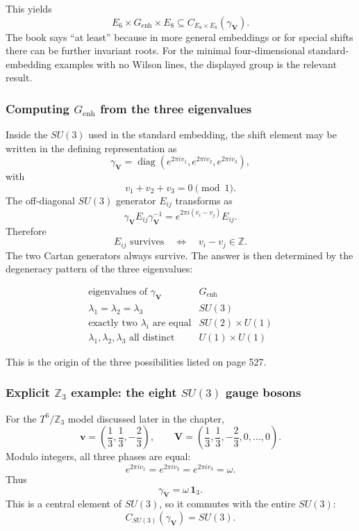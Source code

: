 \documentclass[
  10pt,
  a4paper,
  openany]{book}
\begin{document}
This yields \[
\boxed{
E_6\times G_{\mathrm{enh}}\times E_8
\subseteq
C_{E_8\times E_8}(\gamma_{\mathbf V})
}.
\] The book says ``at least'' because in more general embeddings or for
special shifts there can be further invariant roots. For the minimal
four-dimensional standard-embedding examples with no Wilson lines, the
displayed group is the relevant result.

\subsubsection{\texorpdfstring{Computing \(G_{\mathrm{enh}}\) from the
three
eigenvalues}{Computing G\_\{\textbackslash mathrm\{enh\}\} from the three eigenvalues}}\label{computing-g_mathrmenh-from-the-three-eigenvalues}

Inside the \(SU(3)\) used in the standard embedding, the shift element
may be written in the defining representation as \[
\gamma_{\mathbf V}
=
\operatorname{diag}
\left(
e^{2\pi i v_1},
e^{2\pi i v_2},
e^{2\pi i v_3}
\right),
\] with \[
v_1+v_2+v_3=0\pmod1.
\] The off-diagonal \(SU(3)\) generator \(E_{ij}\) transforms as \[
\gamma_{\mathbf V}E_{ij}\gamma_{\mathbf V}^{-1}
=
e^{2\pi i(v_i-v_j)}E_{ij}.
\] Therefore \[
E_{ij}\text{ survives}
\quad\Longleftrightarrow\quad
v_i-v_j\in\mathbb Z.
\] The two Cartan generators always survive. The answer is then
determined by the degeneracy pattern of the three eigenvalues:

\[
\boxed{
\begin{array}{c|c}
\text{eigenvalues of }\gamma_{\mathbf V}
&
G_{\mathrm{enh}}
\\ \hline
\lambda_1=\lambda_2=\lambda_3
&
SU(3)
\\
\text{exactly two }\lambda_i\text{ are equal}
&
SU(2)\times U(1)
\\
\lambda_1,\lambda_2,\lambda_3\text{ all distinct}
&
U(1)\times U(1)
\end{array}
}
\]

This is the origin of the three possibilities listed on page 527.

\subsubsection{\texorpdfstring{Explicit \(\mathbb Z_3\) example: the
eight \(SU(3)\) gauge
bosons}{Explicit \textbackslash mathbb Z\_3 example: the eight SU(3) gauge bosons}}\label{explicit-mathbb-z_3-example-the-eight-su3-gauge-bosons}

For the \(T^6/\mathbb Z_3\) model discussed later in the chapter, \[
\mathbf v
=
\left(
\frac13,\frac13,-\frac23
\right),
\qquad
\mathbf V
=
\left(
\frac13,\frac13,-\frac23,0,\ldots,0
\right).
\] Modulo integers, all three phases are equal: \[
e^{2\pi i v_1}
=
e^{2\pi i v_2}
=
e^{2\pi i v_3}
=
\omega.
\] Thus \[
\gamma_{\mathbf V}
=
\omega\,\mathbf1_3.
\] This is a central element of \(SU(3)\), so it commutes with the
entire \(SU(3)\): \[
C_{SU(3)}(\gamma_{\mathbf V})=SU(3).
\]
\end{document}
